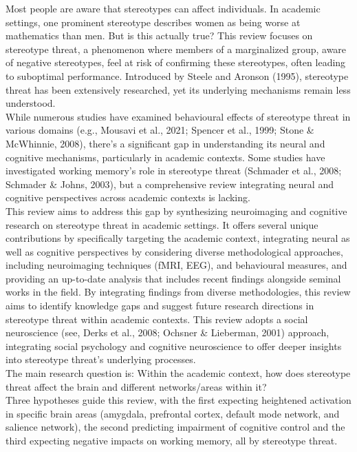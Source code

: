 \documentclass[
  stu, a4paper,floatsintext]{apa7}
\begin{document}
Most people are aware that stereotypes can affect individuals. In academic settings, one prominent stereotype describes women as being worse at mathematics than men. But is this actually true? This review focuses on stereotype threat, a phenomenon where members of a marginalized group, aware of negative stereotypes, feel at risk of confirming these stereotypes, often leading to suboptimal performance. Introduced by Steele and Aronson (1995), stereotype threat has been extensively researched, yet its underlying mechanisms remain less understood.\\
While numerous studies have examined behavioural effects of stereotype threat in various domains (e.g., Mousavi et al., 2021; Spencer et al., 1999; Stone \& McWhinnie, 2008), there's a significant gap in understanding its neural and cognitive mechanisms, particularly in academic contexts. Some studies have investigated working memory's role in stereotype threat (Schmader et al., 2008; Schmader \& Johns, 2003), but a comprehensive review integrating neural and cognitive perspectives across academic contexts is lacking.\\
This review aims to address this gap by synthesizing neuroimaging and cognitive research on stereotype threat in academic settings.
It offers several unique contributions by specifically targeting the academic context, integrating neural as well as cognitive perspectives by considering diverse methodological approaches, including neuroimaging techniques (fMRI, EEG), and behavioural measures, and providing an up-to-date analysis that includes recent findings alongside seminal works in the field.
By integrating findings from diverse methodologies, this review aims to identify knowledge gaps and suggest future research directions in stereotype threat within academic contexts.
This review adopts a social neuroscience (see, Derks et al., 2008; Ochsner \& Lieberman, 2001) approach, integrating social psychology and cognitive neuroscience to offer deeper insights into stereotype threat's underlying processes.\\
The main research question is: Within the academic context, how does stereotype threat affect the brain and different networks/areas within it?\\
Three hypotheses guide this review, with the first expecting heightened activation in specific brain areas (amygdala, prefrontal cortex, default mode network, and salience network), the second predicting impairment of cognitive control and the third expecting negative impacts on working memory, all by stereotype threat.\\
\end{document}
